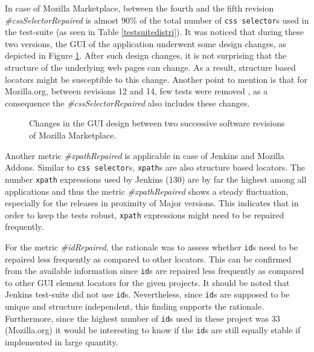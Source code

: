 In case of Mozilla Marketplace, between the fourth and the fifth revision \textit{\#cssSelectorRepaired} is almost 90\% of the total number of \texttt{css selector}s used in the test-suite (as seen in Table \ref{testsuitedistri}). It was noticed that during these two versions, the GUI of the application underwent some design changes, as depicted in Figure \ref{fig:fireplacechanges}. After such design changes, it is not surprising that the structure of the underlying web pages can change. As a result, structure based locators might be susceptible to this change. Another point to mention is that for Mozilla.org, between revisions 12 and 14, few tests were removed \cite{deletedtest}, as a consequence the \textit{\#cssSelectorRepaired} also includes these changes.
\begin{figure}[htb!] 
\centering     %
{}
  \captionsetup{justification=justified,
singlelinecheck=false}
\caption{Changes in the GUI design between two successive software revisions of Mozilla Marketplace.}
\label{fig:fireplacechanges}
\end{figure}
Another metric \textit{\#xpathRepaired} is applicable in case of Jenkins and Mozilla Addons. Similar to \texttt{css selector}s, \texttt{xpath}s are also structure based locators. The number \texttt{xpath} expressions used by Jenkins (130) are by far the highest among all applications and thus the metric \textit{\#xpathRepaired} shows a steady fluctuation, especially for the releases in proximity of Major versions. This indicates that in order to keep the tests robust, \texttt{xpath} expressions might need to be repaired frequently.

For the metric \textit{\#idRepaired}, the rationale was to assess whether \texttt{id}s need to be repaired less frequently as compared to other locators. This can be confirmed from the available information since \texttt{id}s are repaired less frequently as compared to other GUI element locators for the given projects. It should be noted that Jenkins test-suite did not use \texttt{id}s. Nevertheless, since \texttt{id}s are supposed to be unique and structure independent, this finding supports the rationale. Furthermore, since the highest number of  \texttt{id}s used in these project was 33 (Mozilla.org) it would be interesting to know if the \texttt{id}s are still equally stable if implemented in large quantity.

